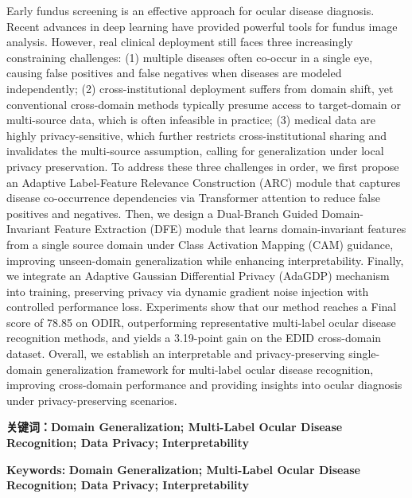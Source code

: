 Early fundus screening is an effective approach for ocular disease diagnosis. Recent advances in deep learning have provided powerful tools for fundus image analysis. However, real clinical deployment still faces three increasingly constraining challenges: (1) multiple diseases often co-occur in a single eye, causing false positives and false negatives when diseases are modeled independently; (2) cross-institutional deployment suffers from domain shift, yet conventional cross-domain methods typically presume access to target-domain or multi-source data, which is often infeasible in practice; (3) medical data are highly privacy-sensitive, which further restricts cross-institutional sharing and invalidates the multi-source assumption, calling for generalization under local privacy preservation. To address these three challenges in order, we first propose an Adaptive Label-Feature Relevance Construction (ARC) module that captures disease co-occurrence dependencies via Transformer attention to reduce false positives and negatives. Then, we design a Dual-Branch Guided Domain-Invariant Feature Extraction (DFE) module that learns domain-invariant features from a single source domain under Class Activation Mapping (CAM) guidance, improving unseen-domain generalization while enhancing interpretability. Finally, we integrate an Adaptive Gaussian Differential Privacy (AdaGDP) mechanism into training, preserving privacy via dynamic gradient noise injection with controlled performance loss. Experiments show that our method reaches a Final score of 78.85 on ODIR, outperforming representative multi-label ocular disease recognition methods, and yields a 3.19-point gain on the EDID cross-domain dataset. Overall, we establish an interpretable and privacy-preserving single-domain generalization framework for multi-label ocular disease recognition, improving cross-domain performance and providing insights into ocular diagnosis under privacy-preserving scenarios.

\noindent\textbf{关键词：}\textbf{Domain Generalization; Multi-Label Ocular Disease Recognition; Data Privacy; Interpretability}

\noindent\textbf{Keywords:}\textbf{ Domain Generalization; Multi-Label Ocular Disease Recognition; Data Privacy; Interpretability}
